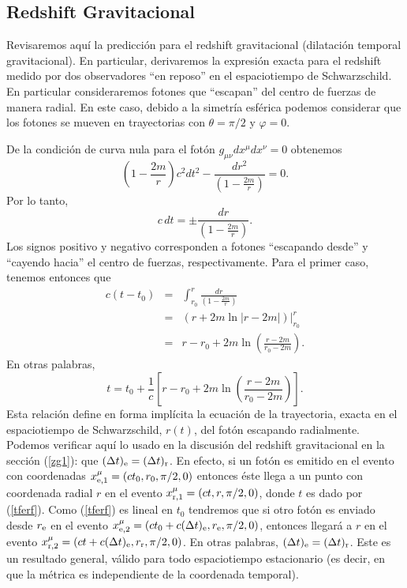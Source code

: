 \subsection{Redshift Gravitacional}\label{sec:redshift}
Revisaremos aquí la predicción para el redshift gravitacional (dilatación temporal gravitacional). En particular, derivaremos la expresión exacta para el redshift medido por dos observadores ``en reposo'' en el espaciotiempo de Schwarzschild. En particular consideraremos fotones que ``escapan'' del centro de fuerzas de manera radial. En este caso, debido a la simetría esférica podemos considerar que los fotones se mueven en trayectorias con $\theta=\pi/2$ y $\varphi=0$.

De la condición de curva nula para el fotón $g_{\mu\nu}dx^\mu dx^\nu=0$ obtenemos
\begin{equation}
 \left(1-\frac{2m}{r}\right)c^2dt^2-\frac{dr^2}{ \left(1-\frac{2m}{r}\right)}=0.
\end{equation}
Por lo tanto,
\begin{equation}
 c\,dt=\pm\frac{dr}{ \left(1-\frac{2m}{r}\right)}.
\end{equation}
Los signos positivo y negativo corresponden a fotones ``escapando desde'' y ``cayendo hacia'' el centro de fuerzas, respectivamente. Para el primer caso, tenemos entonces que
\begin{eqnarray}
 c(t-t_0)&=&\int^r_{r_0}\frac{dr}{\left(1-\frac{2m}{r}\right)} \\
&=&\left.\left(r+2m\ln|r-2m|\right)\right|^r_{r_0} \\
&=&r-r_0+2m\ln\left(\frac{r-2m}{r_0-2m}\right).
\end{eqnarray}
En otras palabras,
\begin{equation} \label{tferf}
 t=t_0+\frac{1}{c}\left[r-r_0+2m\ln\left(\frac{r-2m}{r_0-2m}\right)\right].
\end{equation}
Esta relación define en forma implícita la ecuación de la trayectoria, exacta en el espaciotiempo de Schwarzschild, $r(t)$, del fotón escapando radialmente. Podemos verificar  aquí lo usado en la discusión del redshift gravitacional en la sección (\ref{zg1}): que $(\Delta t)_{\rm e}=(\Delta t)_{\rm r}$. En efecto, si un fotón es emitido en el evento con coordenadas $x^\mu_{{\rm e},1}=(ct_0,r_0,\pi/2,0)$ entonces éste llega a un punto con coordenada radial $r$ en el evento $x^\mu_{{\rm r},1}=(ct,r,\pi/2,0)$, donde $t$ es dado por (\ref{tferf}). Como (\ref{tferf}) es lineal en $t_0$ tendremos que si otro fotón es enviado desde $r_{\rm e}$ en el evento $x^\mu_{{\rm e},2}=(ct_0+c(\Delta t)_{\rm e},r_{\rm e},\pi/2,0)$, entonces llegará a $r$ en el evento $x^\mu_{{\rm r},2}=(ct+c(\Delta t)_{\rm e},r_{\rm r},\pi/2,0)$. En otras palabras, $(\Delta t)_{\rm e}=(\Delta t)_{\rm r}$. Este es un resultado general, válido para todo espaciotiempo estacionario (es decir, en que la métrica es independiente de la coordenada temporal).

